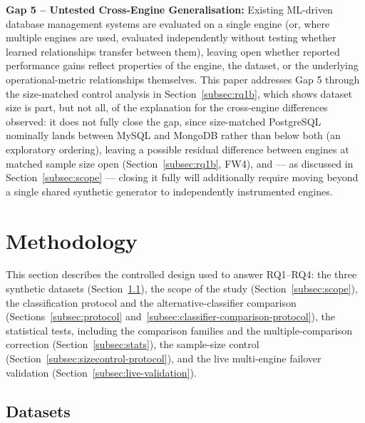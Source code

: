 \documentclass[iicol,pdflatex,sn-mathphys-num]{sn-jnl}
\theoremstyle{thmstyleone}
\theoremstyle{thmstylethree}
\begin{document}
\textbf{Gap 5 -- Untested Cross-Engine Generalisation:} Existing
ML-driven database management systems are evaluated on a single engine
(or, where multiple engines are used, evaluated independently without
testing whether learned relationships transfer between them), leaving
open whether reported performance gains reflect properties of the
engine, the dataset, or the underlying operational-metric relationships
themselves. This paper addresses Gap 5 through the size-matched
control analysis in Section~\ref{subsec:rq1b}, which shows dataset
size is part, but not all, of the explanation for the cross-engine
differences observed: it does not fully close the gap, since
size-matched PostgreSQL nominally lands between MySQL and MongoDB rather
than below both (an exploratory ordering), leaving a possible residual
difference between engines at matched sample size open (Section~\ref{subsec:rq1b}, FW4), and --- as
discussed in Section~\ref{subsec:scope} --- closing it fully will
additionally require moving beyond a single shared synthetic generator
to independently instrumented engines.

\section{Methodology}\label{sec:methodology}

This section describes the controlled design used to answer RQ1--RQ4:
the three synthetic datasets (Section~\ref{subsec:datasets}), the scope
of the study (Section~\ref{subsec:scope}), the classification protocol
and the alternative-classifier comparison
(Sections~\ref{subsec:protocol} and~\ref{subsec:classifier-comparison-protocol}),
the statistical tests, including the comparison families and the
multiple-comparison correction (Section~\ref{subsec:stats}), the
sample-size control (Section~\ref{subsec:sizecontrol-protocol}), and the
live multi-engine failover validation
(Section~\ref{subsec:live-validation}).

\subsection{Datasets}\label{subsec:datasets}
\end{document}
